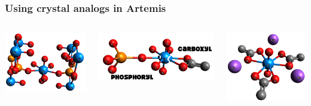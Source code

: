 \documentclass[10pt, xcolor=x11names, compress]{beamer}
\begin{document}
\begin{frame}
  \frametitle{Using crystal analogs in Artemis}
  \begin{columns}[b]
    \begin{column}{0.33\linewidth}
      \begin{center}
        \includegraphics[width=0.7\linewidth]{images/upo4_full.png}
      \end{center}
    \end{column}
    \begin{column}{0.33\linewidth}
      \includegraphics[width=\linewidth]{images/uranyl.png}
    \end{column}
    \begin{column}{0.33\linewidth}
      \begin{center}
        \includegraphics[width=0.65\linewidth]{images/NaU_triacetate.png}
      \end{center}
    \end{column}
  \end{columns}


\end{frame}
\end{document}
